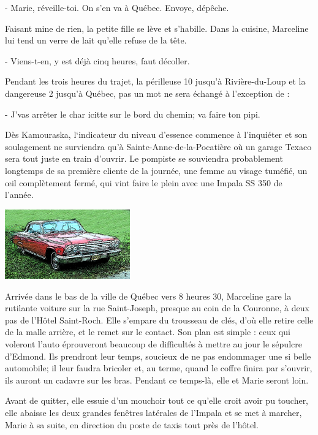 - Marie, réveille-toi. On s’en va à Québec. Envoye, dépêche.

Faisant mine de rien, la petite fille se lève et s’habille. Dans la cuisine, Marceline lui tend un verre de lait qu’elle refuse de la tête.

- Viens-t-en, y est déjà cinq heures, faut décoller.

Pendant les trois heures du trajet, la périlleuse 10 jusqu’à Rivière-du-Loup et la dangereuse 2 jusqu’à Québec, pas un mot ne sera échangé à l’exception de :

- J’vas arrêter le char icitte sur le bord du chemin; va faire ton pipi.

Dès Kamouraska, l‘indicateur du niveau d’essence commence à l’inquiéter et son soulagement ne surviendra qu’à Sainte-Anne-de-la-Pocatière où un garage Texaco sera tout juste en train d’ouvrir. Le pompiste se souviendra probablement longtemps de sa première cliente de la journée, une femme au visage tuméfié, un œil complètement fermé, qui vint faire le plein avec une Impala SS 350 de l’année.

\begin{floatingfigure}[l]{60mm}
\includegraphics[height=30mm]{corps/chapitre10/img/voiture.jpg}
\end{floatingfigure}

Arrivée dans le bas de la ville de Québec vers 8 heures 30, Marceline gare la rutilante voiture sur la rue Saint-Joseph, presque au coin de la Couronne, à deux pas de l’Hôtel Saint-Roch. Elle s’empare du trousseau de clés, d’où elle retire celle de la malle arrière, et le remet sur le contact. Son plan est simple : ceux qui voleront l’auto éprouveront beaucoup de difficultés à mettre au jour le sépulcre d’Edmond. Ils prendront leur temps, soucieux de ne pas endommager une si belle automobile; il leur faudra bricoler et, au terme, quand le coffre finira par s’ouvrir, ils auront un cadavre sur les bras. Pendant ce temps-là, elle et Marie seront loin.

Avant de quitter, elle essuie d’un mouchoir tout ce qu’elle croit avoir pu toucher, elle abaisse les deux grandes fenêtres latérales de l’Impala et se met à marcher, Marie à sa suite, en direction du poste de taxis tout près de l’hôtel.


